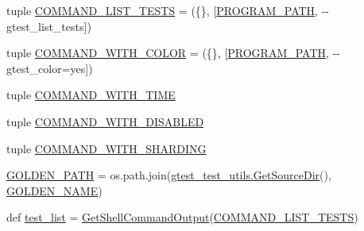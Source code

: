 \begin{DoxyCompactItemize}
\item 
tuple \mbox{\hyperlink{namespacegoogletest-master_1_1googletest_1_1test_1_1googletest-output-test_a75e033931a0e3f81ecd77fbbcee0ed50}{C\+O\+M\+M\+A\+N\+D\+\_\+\+L\+I\+S\+T\+\_\+\+T\+E\+S\+TS}} = (\{\}, \mbox{[}\mbox{\hyperlink{namespacegoogletest-master_1_1googletest_1_1test_1_1googletest-output-test_adf02ad1211aa7490cfa528d2122115a5}{P\+R\+O\+G\+R\+A\+M\+\_\+\+P\+A\+TH}}, \textquotesingle{}-\/-\/gtest\+\_\+list\+\_\+tests\textquotesingle{}\mbox{]})
\item 
tuple \mbox{\hyperlink{namespacegoogletest-master_1_1googletest_1_1test_1_1googletest-output-test_a374ad595e6794f255772251c2377ad35}{C\+O\+M\+M\+A\+N\+D\+\_\+\+W\+I\+T\+H\+\_\+\+C\+O\+L\+OR}} = (\{\}, \mbox{[}\mbox{\hyperlink{namespacegoogletest-master_1_1googletest_1_1test_1_1googletest-output-test_adf02ad1211aa7490cfa528d2122115a5}{P\+R\+O\+G\+R\+A\+M\+\_\+\+P\+A\+TH}}, \textquotesingle{}-\/-\/gtest\+\_\+color=yes\textquotesingle{}\mbox{]})
\item 
tuple \mbox{\hyperlink{namespacegoogletest-master_1_1googletest_1_1test_1_1googletest-output-test_aa75ecbcea5f95c052d6dadf82c86b5f2}{C\+O\+M\+M\+A\+N\+D\+\_\+\+W\+I\+T\+H\+\_\+\+T\+I\+ME}}
\item 
tuple \mbox{\hyperlink{namespacegoogletest-master_1_1googletest_1_1test_1_1googletest-output-test_a538a1c0f179b9b28b7dab5f91a009eaf}{C\+O\+M\+M\+A\+N\+D\+\_\+\+W\+I\+T\+H\+\_\+\+D\+I\+S\+A\+B\+L\+ED}}
\item 
tuple \mbox{\hyperlink{namespacegoogletest-master_1_1googletest_1_1test_1_1googletest-output-test_aa9e69c23bb24f0e91a08d12c035c252a}{C\+O\+M\+M\+A\+N\+D\+\_\+\+W\+I\+T\+H\+\_\+\+S\+H\+A\+R\+D\+I\+NG}}
\item 
\mbox{\hyperlink{namespacegoogletest-master_1_1googletest_1_1test_1_1googletest-output-test_ab0041b00c5cd02be70d08c0b84ecf67f}{G\+O\+L\+D\+E\+N\+\_\+\+P\+A\+TH}} = os.\+path.\+join(\mbox{\hyperlink{namespacegoogletest-master_1_1googletest_1_1test_1_1gtest__test__utils_a5b2487a7b4864fb1c1fd6d5c283062ef}{gtest\+\_\+test\+\_\+utils.\+Get\+Source\+Dir}}(), \mbox{\hyperlink{namespacegoogletest-master_1_1googletest_1_1test_1_1googletest-output-test_a54841f0cc54659ea2d823867932dd1f6}{G\+O\+L\+D\+E\+N\+\_\+\+N\+A\+ME}})
\item 
def \mbox{\hyperlink{namespacegoogletest-master_1_1googletest_1_1test_1_1googletest-output-test_a93698fa9205c2bafeaffda6a6aad40c7}{test\+\_\+list}} = \mbox{\hyperlink{namespacegoogletest-master_1_1googletest_1_1test_1_1googletest-output-test_aa982dca3285605db207fb98817d0c456}{Get\+Shell\+Command\+Output}}(\mbox{\hyperlink{namespacegoogletest-master_1_1googletest_1_1test_1_1googletest-output-test_a75e033931a0e3f81ecd77fbbcee0ed50}{C\+O\+M\+M\+A\+N\+D\+\_\+\+L\+I\+S\+T\+\_\+\+T\+E\+S\+TS}})

\end{DoxyCompactItemize}
